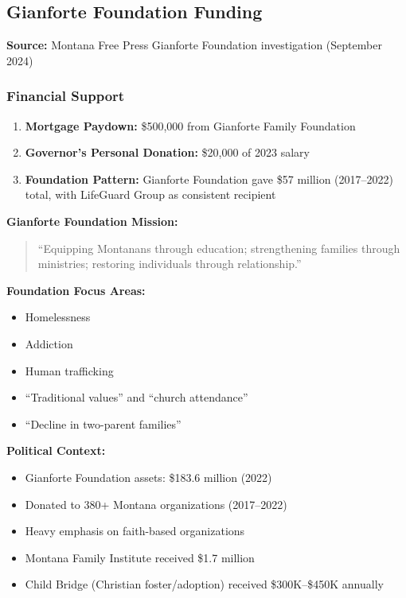 \documentclass[11pt,letterpaper]{article}
\newenvironment{testimony}{%
    \begin{quote}\itshape\color{DarkGray}%
}{%
    \end{quote}%
}
\begin{document}
\subsection{Gianforte Foundation Funding}

\textbf{Source:} Montana Free Press Gianforte Foundation investigation (September 2024)

\subsubsection{Financial Support}

\begin{enumerate}[leftmargin=*]
\item \textbf{Mortgage Paydown:} \$500,000 from Gianforte Family Foundation
\item \textbf{Governor's Personal Donation:} \$20,000 of 2023 salary
\item \textbf{Foundation Pattern:} Gianforte Foundation gave \$57 million (2017--2022) total, with LifeGuard Group as consistent recipient
\end{enumerate}

\textbf{Gianforte Foundation Mission:}
\begin{testimony}
``Equipping Montanans through education; strengthening families through ministries; restoring individuals through relationship.''
\end{testimony}

\textbf{Foundation Focus Areas:}
\begin{itemize}[leftmargin=*]
\item Homelessness
\item Addiction
\item Human trafficking
\item ``Traditional values'' and ``church attendance''
\item ``Decline in two-parent families''
\end{itemize}

\textbf{Political Context:}
\begin{itemize}[leftmargin=*]
\item Gianforte Foundation assets: \$183.6 million (2022)
\item Donated to 380+ Montana organizations (2017--2022)
\item Heavy emphasis on faith-based organizations
\item Montana Family Institute received \$1.7 million
\item Child Bridge (Christian foster/adoption) received \$300K--\$450K annually
\end{itemize}
\end{document}
